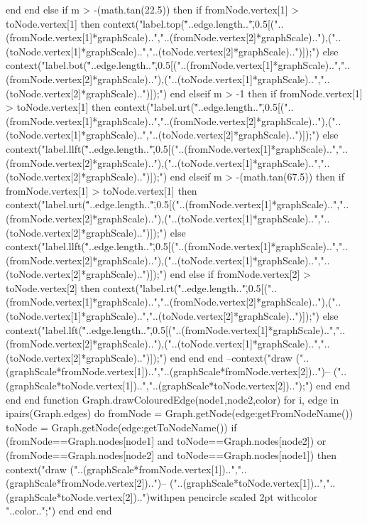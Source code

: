 					end
				end
			else
				if m > -(math.tan(22.5)) then
					if fromNode.vertex[1] > toNode.vertex[1] then
						context("label.top(\""..edge.length.."\",0.5[("..(fromNode.vertex[1]*graphScale)..","..(fromNode.vertex[2]*graphScale).."),("..(toNode.vertex[1]*graphScale)..","..(toNode.vertex[2]*graphScale)..")]);")
					else
						context("label.bot(\""..edge.length.."\",0.5[("..(fromNode.vertex[1]*graphScale)..","..(fromNode.vertex[2]*graphScale).."),("..(toNode.vertex[1]*graphScale)..","..(toNode.vertex[2]*graphScale)..")]);")
					end
				elseif m > -1 then
					if fromNode.vertex[1] > toNode.vertex[1] then
						context("label.urt(\""..edge.length.."\",0.5[("..(fromNode.vertex[1]*graphScale)..","..(fromNode.vertex[2]*graphScale).."),("..(toNode.vertex[1]*graphScale)..","..(toNode.vertex[2]*graphScale)..")]);")
					else
						context("label.llft(\""..edge.length.."\",0.5[("..(fromNode.vertex[1]*graphScale)..","..(fromNode.vertex[2]*graphScale).."),("..(toNode.vertex[1]*graphScale)..","..(toNode.vertex[2]*graphScale)..")]);")
					end
				elseif m > -(math.tan(67.5)) then
					if fromNode.vertex[1] > toNode.vertex[1] then
						context("label.urt(\""..edge.length.."\",0.5[("..(fromNode.vertex[1]*graphScale)..","..(fromNode.vertex[2]*graphScale).."),("..(toNode.vertex[1]*graphScale)..","..(toNode.vertex[2]*graphScale)..")]);")
					else
						context("label.llft(\""..edge.length.."\",0.5[("..(fromNode.vertex[1]*graphScale)..","..(fromNode.vertex[2]*graphScale).."),("..(toNode.vertex[1]*graphScale)..","..(toNode.vertex[2]*graphScale)..")]);")
					end
				else
					if fromNode.vertex[2] > toNode.vertex[2] then
						context("label.rt(\""..edge.length.."\",0.5[("..(fromNode.vertex[1]*graphScale)..","..(fromNode.vertex[2]*graphScale).."),("..(toNode.vertex[1]*graphScale)..","..(toNode.vertex[2]*graphScale)..")]);")
					else
						context("label.lft(\""..edge.length.."\",0.5[("..(fromNode.vertex[1]*graphScale)..","..(fromNode.vertex[2]*graphScale).."),("..(toNode.vertex[1]*graphScale)..","..(toNode.vertex[2]*graphScale)..")]);")
					end
				end
			end
			--context("draw ("..(graphScale*fromNode.vertex[1])..","..(graphScale*fromNode.vertex[2])..")-- ("..(graphScale*toNode.vertex[1])..","..(graphScale*toNode.vertex[2])..");")
		end
	end
	end
end
function Graph.drawColouredEdge(node1,node2,color)
	for i, edge in ipairs(Graph.edges) do
		fromNode = Graph.getNode(edge:getFromNodeName())
		toNode = Graph.getNode(edge:getToNodeName())
		if (fromNode==Graph.nodes[node1] and toNode==Graph.nodes[node2]) or (fromNode==Graph.nodes[node2] and toNode==Graph.nodes[node1]) then
			context("draw ("..(graphScale*fromNode.vertex[1])..","..(graphScale*fromNode.vertex[2])..")-- ("..(graphScale*toNode.vertex[1])..","..(graphScale*toNode.vertex[2])..")withpen pencircle scaled 2pt withcolor "..color..";")
		end
	end
end


